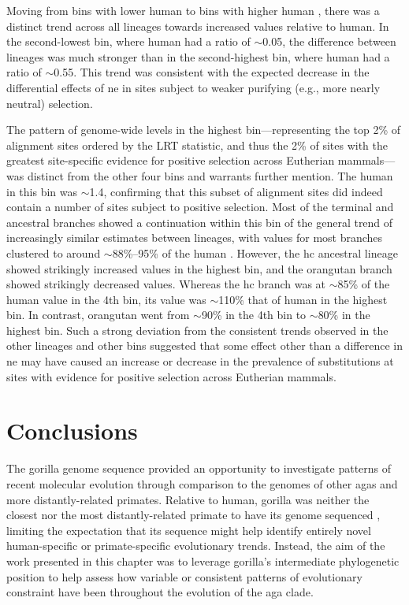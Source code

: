 Moving from bins with lower human \dnds to bins with higher human
\dnds, there was a distinct trend across all lineages towards
increased \dnds values relative to human. In the second-lowest bin,
where human had a \dnds ratio of $\sim$0.05, the \dnds difference
between lineages was much stronger than in the second-highest bin,
where human had a \dnds ratio of $\sim$0.55. This trend was consistent
with the expected decrease in the differential effects of \ac{ne} in
sites subject to weaker purifying (e.g., more nearly neutral)
selection.

The pattern of genome-wide \dnds levels in the highest
bin---representing the top 2\% of alignment sites ordered by the LRT
statistic, and thus the 2\% of sites with the greatest site-specific
evidence for positive selection across Eutherian mammals---was
distinct from the other four bins and warrants further mention. The
human \dnds in this bin was $\sim$1.4, confirming that this subset of
alignment sites did indeed contain a number of sites subject to
positive selection. Most of the terminal and ancestral branches showed
a continuation within this bin of the general trend of increasingly
similar \dnds estimates between lineages, with values for most
branches clustered to around $\sim$88\%--95\% of the human
\dnds. However, the \ac{hc} ancestral lineage showed strikingly
increased \dnds values in the highest bin, and the orangutan branch
showed strikingly decreased values. Whereas the \ac{hc} branch was at
$\sim$85\% of the human value in the 4th bin, its value was
$\sim$110\% that of human in the highest bin. In contrast, orangutan
went from $\sim$90\% in the 4th bin to $\sim$80\% in the highest
bin. Such a strong deviation from the consistent trends observed in
the other lineages and other bins suggested that some effect other
than a difference in \ac{ne} may have caused an increase or decrease
in the prevalence of \nsyn substitutions at sites with evidence for
positive selection across Eutherian mammals.

\section{Conclusions}

The gorilla genome sequence provided an opportunity to investigate
patterns of recent molecular evolution through comparison to the
genomes of other \acp{aga} and more distantly-related
primates. Relative to human, gorilla was neither the closest
\citep{Sequencing2005a} nor the most distantly-related primate to have
its genome sequenced \citep{Macaque2007,Locke2011}, limiting the
expectation that its sequence might help identify entirely novel
human-specific or primate-specific evolutionary trends. Instead, the
aim of the work presented in this chapter was to leverage gorilla's
intermediate phylogenetic position to help assess how variable or
consistent patterns of evolutionary constraint have been throughout
the evolution of the \ac{aga} clade.

